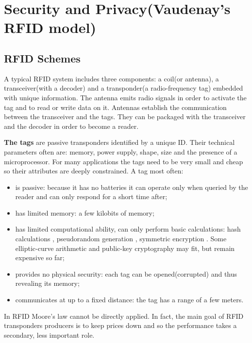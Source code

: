 \chapter{Security and Privacy(Vaudenay's RFID model)}

\section{RFID Schemes}

    A typical RFID system includes three components: a coil(or antenna), a transceiver(with a decoder) and a
    transponder(a radio-frequency tag) embedded with unique information. The antenna emits radio signals in order to activate the tag and to read or write 
    data on it. Antennas establish the communication between the transceiver and the tags. They can be packaged with the transceiver and the decoder in order to become
    a reader. 

\vspace*{0.1cm} 

        \textbf{The tags} are passive transponders identified by a unique ID. Their technical parameters often are: memory, power supply, shape, size and the presence of a 
    microprocessor. For many applications the tags need to be very small and cheap so their attributes are deeply constrained. A tag most often:
    \begin{itemize}
        \item is passive: because it has no batteries it can operate only when queried by the reader and can only respond for a short time after;
        \item has limited memory: a few kilobits of memory;
        \item has limited computational ability, can only perform basic calculations: hash calculations \cite{Feldhofer}, pseudorandom generation \cite{Robshaw}, 
        symmetric encryption \cite{Feldhofer2}. Some elliptic-curve arithmetic and public-key cryptography may fit, but remain expensive so far;
        \item provides no physical security: each tag can be opened(corrupted) and thus revealing its memory;
        \item communicates at up to a fixed distance: the tag has a range of a few meters.
    \end{itemize}
    
        In RFID Moore's law cannot be directly applied. In fact, the main goal of RFID transponders producers is to keep prices down and so the performance takes
    a secondary, less important role.

